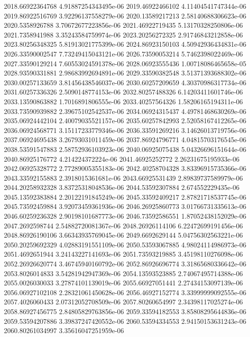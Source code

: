 {2018.66922364768 4.91887254343495e-06
2019.46922466102 4.11404541747344e-06
2019.86922516769 3.92296137558279e-06
2020.13589217213 2.58140688306623e-06
2020.5358926788 3.70672677223856e-06
2021.46922719435 5.13170328250806e-06
2021.7358941988 3.35243584759974e-06
2023.20256272325 2.91746843212858e-06
2023.80256348325 5.81913021775399e-06
2024.86923150103 4.50942936434831e-06
2026.33590002547 7.73249415043121e-06
2026.73590053214 5.7462398022469e-06
2027.33590129214 7.60553024591378e-06
2028.06923555436 1.00718086465658e-05
2028.93590331881 2.98683992694891e-06
2029.33590382548 3.51371393688302e-06
2030.00257133659 3.81456438546037e-06
2030.60257209659 4.30370986317734e-06
2031.60257336326 2.5090148774153e-06
2032.80257488326 6.14203411601746e-06
2033.13590863882 1.7016891806555e-06
2033.40257564326 1.58206165194311e-06
2033.73590939882 2.39675102542537e-06
2034.06924315437 4.49781468630269e-06
2035.06924442104 2.40079035521157e-06
2035.60257842993 2.52058167412265e-06
2036.06924568771 3.15117233779346e-06
2036.33591269216 3.14626013719756e-06
2037.06924695438 3.26793031011459e-06
2037.86924796771 4.04815703176545e-06
2038.53591547883 2.58752936103923e-06
2040.06925075438 5.04326696151644e-06
2040.86925176772 4.214224372224e-06
2041.46925252772 2.26231675195933e-06
2042.06925328772 2.77289005355183e-06
2042.40258704328 3.83396915735366e-06
2043.33592155883 2.3918015361681e-06
2043.66925531439 2.89839737589979e-06
2044.20258932328 3.83725318048536e-06
2044.53592307884 2.674552229435e-06
2045.13592383884 2.20122191845249e-06
2045.33592409217 2.87821718537745e-06
2045.73592459884 3.92073459361936e-06
2046.26925860773 3.01766731335613e-06
2046.60259236328 2.90198101687773e-06
2046.73592586551 1.87052438152029e-06
2047.2692598744 2.54882720081367e-06
2048.26926114106 6.22472699191456e-06
2048.86926190106 3.66343935769045e-06
2049.6692629144 5.04756302563221e-06
2050.20259692329 4.02883191551109e-06
2050.53593067885 4.98024114986973e-06
2051.4692651944 3.24143227141693e-06
2051.73593219885 3.45198110276098e-06
2052.26926620774 3.46745940160792e-06
2052.86926696774 3.31865680336642e-06
2053.8026014833 3.54281942947369e-06
2054.13593523885 2.74067495714388e-06
2055.0026030033 3.27874101139019e-06
2055.66927051441 2.27434153097139e-06
2056.06927102108 2.28321061450628e-06
2056.46927152774 3.33999999092555e-06
2057.4026060433 2.07312052708509e-06
2057.80260654997 2.34398117025274e-06
2058.86927456775 2.84805829763856e-06
2059.33594182553 3.85808295644836e-06
2059.53594207886 3.39837247420552e-06
2060.53594334553 2.94150153631243e-06
2060.80261034997 3.35616047251959e-06
}
